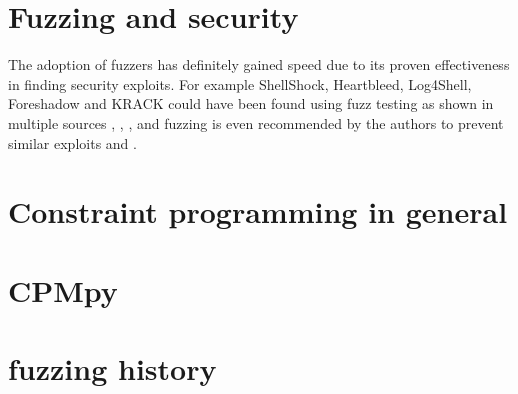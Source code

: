 \section{Fuzzing and security}
The adoption of fuzzers has definitely gained speed due to its proven effectiveness in finding security exploits. For example ShellShock, Heartbleed, Log4Shell, Foreshadow and KRACK could have been found using fuzz testing as shown in multiple sources \cite{ShellShockViaFuzzing}, \cite{HeartbleedViaFuzzing}, \cite{Log4ShellViaFuzzing},  \cite{34ForeshadowViaFuzz} and fuzzing is even recommended by the authors to prevent similar exploits \cite{33KrackViaFuzz} and \cite{35ForeshadowFuzzRecom}.

\section{Constraint programming in general}

\section{CPMpy}

\section{fuzzing history}


